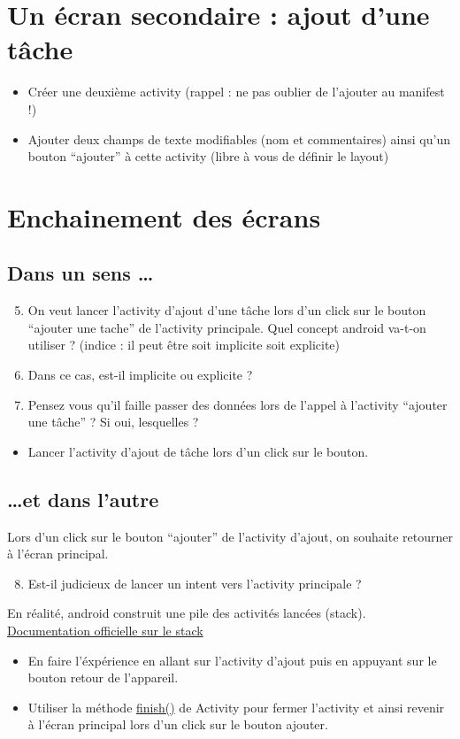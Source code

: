 \documentclass{article}
\begin{document}
\section{Un écran secondaire : ajout d'une tâche}
\begin{itemize}
  \item Créer une deuxième activity (rappel : ne pas oublier de l'ajouter au manifest !)
  \item Ajouter deux champs de texte modifiables (nom et commentaires) ainsi
  qu'un bouton ``ajouter'' à cette activity (libre à vous de définir le layout)
\end{itemize}
\section{Enchainement des écrans}
\subsection{Dans un sens \ldots}
\begin{enumerate}
 \setcounter{enumi}{4}
\item On veut lancer l'activity d'ajout d'une tâche lors d'un click sur le
bouton ``ajouter une tache'' de l'activity principale.
Quel concept android va-t-on utiliser ? (indice : il peut être soit implicite
soit explicite)
\item Dans ce cas, est-il implicite ou explicite ?
\item Pensez vous qu'il faille passer des données lors de l'appel à l'activity ``ajouter une tâche'' ? Si oui, lesquelles ?
\end{enumerate}
\begin{itemize}
  \item Lancer l'activity d'ajout de tâche lors d'un click sur le bouton.
\end{itemize}
\subsection{\ldots et dans l'autre}

Lors d'un click sur le bouton ``ajouter'' de l'activity d'ajout, on souhaite retourner à l'écran principal.
 \begin{enumerate}
 \setcounter{enumi}{7}
\item Est-il judicieux de lancer un intent vers l'activity principale ? 
\end{enumerate}
 En réalité, android construit une pile des activités lancées (stack). \href{http://developer.android.com/guide/components/tasks-and-back-stack.html}{Documentation officielle sur le stack} 
  \begin{itemize}
  \item En faire l'éxpérience en allant sur l'activity d'ajout puis en appuyant
  sur le bouton retour de l'appareil.
  \item Utiliser la méthode
  \href{http://developer.android.com/reference/android/app/Activity.html#finish()}{finish()} de Activity pour fermer l'activity et ainsi revenir à l'écran principal lors d'un click sur le bouton ajouter.
 \end{itemize}
 
\end{document}
